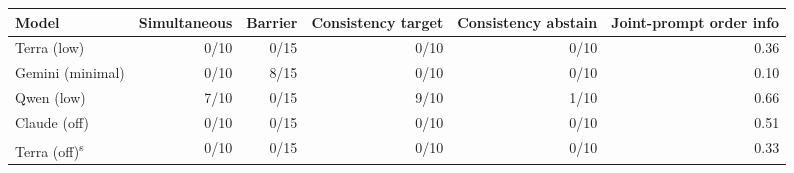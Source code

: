 \begin{adjustbox}{max width=\linewidth}
\begin{tabular}{@{}lrrrrr@{}}
\toprule
Model & Simultaneous & Barrier & Consistency target & Consistency abstain & Joint-prompt order info \\
\midrule
Terra (low) & 0/10 & 0/15 & 0/10 & 0/10 & 0.36 \\
Gemini (minimal) & 0/10 & 8/15 & 0/10 & 0/10 & 0.10 \\
Qwen (low) & 7/10 & 0/15 & 9/10 & 1/10 & 0.66 \\
Claude (off) & 0/10 & 0/15 & 0/10 & 0/10 & 0.51 \\
Terra (off)\textsuperscript{s} & 0/10 & 0/15 & 0/10 & 0/10 & 0.33 \\
\bottomrule
\end{tabular}
\end{adjustbox}

\par{}
